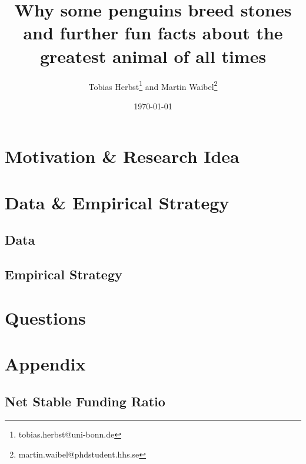 \documentclass[a4paper,12pt]{article}
\title{Why some penguins breed stones and further fun facts about the greatest animal of all times}
\author{Tobias Herbst\thanks{tobias.herbst@uni-bonn.de} and Martin Waibel\thanks{martin.waibel@phdstudent.hhs.se} }
\date{\today}
\begin{document}
\maketitle

\begin{abstract}
\lipsum[1-1]




\end{abstract}

\clearpage
\section{Motivation \& Research Idea}
\label{motivation}


\section{Data \& Empirical Strategy}
\label{data_strategy}

\subsection{Data}
\label{data}



\subsection{Empirical Strategy}
\label{emp_strategy}




\section{Questions}
\label{questions}


\clearpage

\section{Appendix}
\subsection{Net Stable Funding Ratio}
\end{document}
